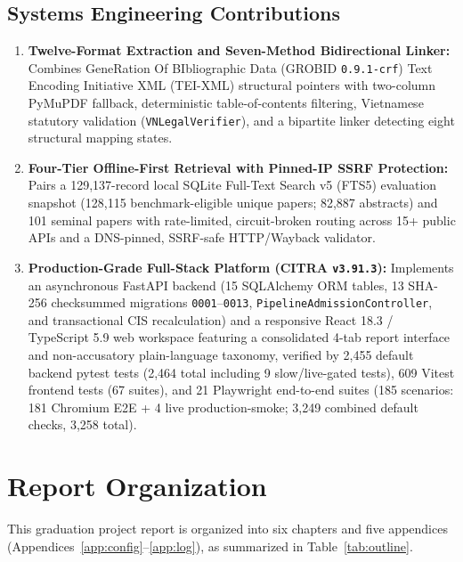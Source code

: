 \subsection{Systems Engineering Contributions}
\begin{enumerate}
    \item \textbf{Twelve-Format Extraction and Seven-Method Bidirectional Linker:} Combines GeneRation Of BIbliographic Data (GROBID \texttt{0.9.1-crf}) Text Encoding Initiative XML (TEI-XML) structural pointers with two-column PyMuPDF fallback, deterministic table-of-contents filtering, Vietnamese statutory validation (\texttt{VNLegalVerifier}), and a bipartite linker detecting eight structural mapping states.
    \item \textbf{Four-Tier Offline-First Retrieval with Pinned-IP SSRF Protection:} Pairs a 129,137-record local SQLite Full-Text Search v5 (FTS5) evaluation snapshot (128,115 benchmark-eligible unique papers; 82,887 abstracts) and 101 seminal papers with rate-limited, circuit-broken routing across 15+ public APIs and a DNS-pinned, SSRF-safe HTTP/Wayback validator.
    \item \textbf{Production-Grade Full-Stack Platform (\textbf{CITRA} \texttt{v3.91.3}):} Implements an asynchronous FastAPI backend (15 SQLAlchemy ORM tables, 13 SHA-256 checksummed migrations \texttt{0001}--\texttt{0013}, \texttt{PipelineAdmissionController}, and transactional CIS recalculation) and a responsive React 18.3 / TypeScript 5.9 web workspace featuring a consolidated 4-tab report interface and non-accusatory plain-language taxonomy, verified by 2,455 default backend pytest tests (2,464 total including 9 slow/live-gated tests), 609 Vitest frontend tests (67 suites), and 21 Playwright end-to-end suites (185 scenarios: 181 Chromium E2E + 4 live production-smoke; 3,249 combined default checks, 3,258 total).
\end{enumerate}

\section{Report Organization}

This graduation project report is organized into six chapters and five appendices (Appendices~\ref{app:config}--\ref{app:log}), as summarized in Table~\ref{tab:outline}.

